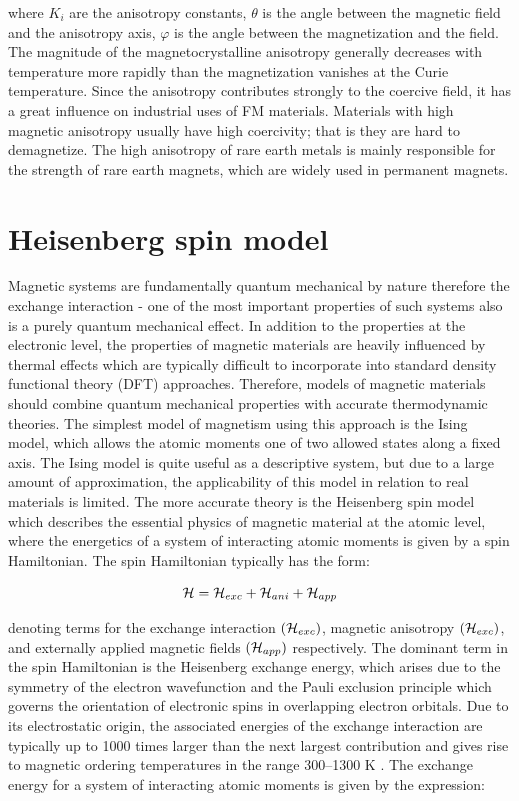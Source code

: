where $K_i$ are the anisotropy constants, $\theta$
is the angle between the magnetic field and the anisotropy axis, $\varphi$ is the angle between
the magnetization and the field.
The magnitude of the magnetocrystalline anisotropy generally decreases with
temperature more rapidly than the magnetization vanishes at the Curie temperature. Since
the anisotropy contributes strongly to the coercive field, it has a great influence on
industrial uses of FM materials. Materials with high magnetic anisotropy
usually have high coercivity; that is they are hard to demagnetize.
The high anisotropy of rare earth metals is mainly responsible for the strength of rare earth magnets, which are widely used in permanent magnets.

\section{Heisenberg spin model}
\label{section: Heisenberg spin model}

Magnetic systems are fundamentally quantum mechanical by nature therefore the exchange interaction - one of the most important properties of such systems also is a purely quantum mechanical effect. In addition to the properties at the electronic level, the properties of magnetic materials are heavily influenced by thermal effects which are typically difficult to incorporate into standard density functional theory (DFT) approaches. Therefore, models of magnetic materials should combine quantum mechanical properties with accurate thermodynamic theories. The simplest model of magnetism using this approach is the Ising model, which allows the atomic moments one of two allowed states along a fixed axis. The Ising model is quite useful as a descriptive system, but due to a large amount of approximation, the applicability of this model in relation to real materials is limited.
The more accurate theory is the Heisenberg spin model which describes the essential physics of magnetic material at the atomic level, where the energetics of a system of interacting atomic moments is given by a spin Hamiltonian. The spin Hamiltonian  typically has the form:

\begin{equation}
{\cal H}={\cal H}_{exc}+{\cal H}_{ani}+{\cal H}_{app}
\end{equation}

denoting terms for the exchange interaction $({\cal H}_{exc})$, magnetic anisotropy $({\cal H}_{exc})$, and externally applied magnetic fields $({\cal H}_{app})$ respectively. The dominant term in the spin Hamiltonian is the Heisenberg exchange energy, which arises due to the symmetry of the electron wavefunction and the Pauli exclusion principle which governs the orientation of electronic spins in overlapping electron orbitals. Due to its electrostatic origin, the associated energies of the exchange interaction are typically up to 1000 times larger than the next largest contribution and gives rise to magnetic ordering temperatures in the range 300–1300 K \cite{Shahjahan_2016}. The exchange energy for a system of interacting atomic moments is given by the expression:

